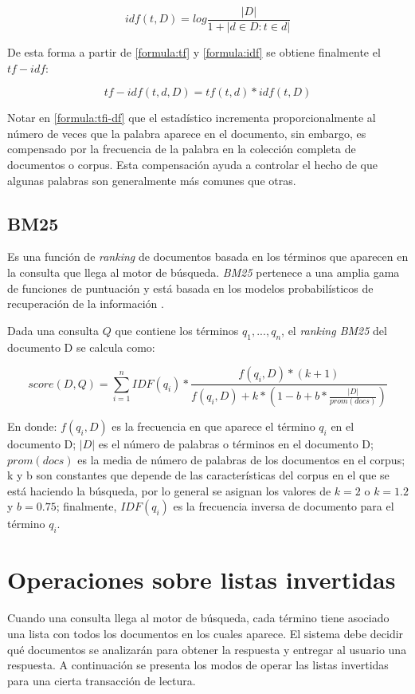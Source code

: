 \begin{equation}
\label{formula:idf}
idf(t,D) = log \frac{ |D| }{1 + |{d \in D : t \in d}|}
\end{equation}

De esta forma a partir de \eqref{formula:tf} y \eqref{formula:idf} se obtiene finalmente el $tf-idf$: 

\begin{equation}
\label{formula:tfi-df}
tf-idf(t,d,D) = tf(t,d) * idf(t,D)
\end{equation}

Notar en \eqref{formula:tfi-df} que el estadístico incrementa proporcionalmente al número de veces que la palabra aparece en el documento, sin embargo, es compensado por la frecuencia de la palabra en la colección completa de documentos o corpus. Esta compensación ayuda a controlar el hecho de que algunas palabras son generalmente más comunes que otras.


\subsection{BM25}
\label{marco:bm25}
Es una función de \textit{ranking} de documentos basada en los términos que aparecen en la consulta que llega al motor de búsqueda. \textit{BM25} pertenece a una amplia gama de funciones de puntuación y está basada en los modelos probabilísticos de recuperación de la información \citep{Baeza-Yates:2011}.

Dada una consulta $Q$ que contiene los términos $q_{1},...,q_{n}$, el \textit{ranking BM25} del documento D se calcula como: 

\begin{equation}
\label{formula:bm25}
score(D,Q) =  \displaystyle\sum_{i=1}^n IDF(q_{i}) * \frac{f(q_{i},D)*(k+1)}{f(q_{i},D)+k * (1 - b + b * \frac{|D|}{prom(docs)})}
\end{equation}

En donde: $f(q_{i}, D)$ es la frecuencia en que aparece el término $q_{i}$ en el documento D; $|D|$ es el número de palabras o términos en el documento D; $prom(docs)$ es la media de número de palabras de los documentos en el corpus; k y b son constantes que depende de las características del corpus en el que se está haciendo la búsqueda, por lo general se asignan los valores de $k = 2$ o $k = 1.2$ y $b = 0.75$; finalmente, $IDF(q_{i})$ es la frecuencia inversa de documento para el término $q_{i}$.


\section{Operaciones sobre listas invertidas}
\label{marco:osli}
Cuando una consulta llega al motor de búsqueda, cada término tiene asociado una lista con todos los documentos en los cuales aparece. El sistema debe decidir qué documentos se analizarán para obtener la respuesta y entregar al usuario una respuesta. A continuación se presenta los modos de operar las listas invertidas para una cierta transacción de lectura.

